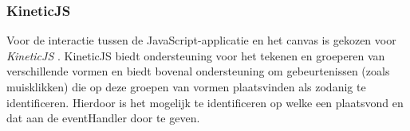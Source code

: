 \subsubsection{KineticJS}
Voor de interactie tussen de JavaScript-applicatie en het canvas is gekozen voor \emph{KineticJS} \cite{KineticJS}. KineticJS biedt ondersteuning voor het tekenen en groeperen van verschillende vormen en biedt bovenal ondersteuning om gebeurtenissen (zoals muisklikken) die op deze groepen van vormen plaatsvinden als zodanig te identificeren. Hierdoor is het mogelijk te identificeren op welke  een  plaatsvond en dat aan de eventHandler door te geven.
